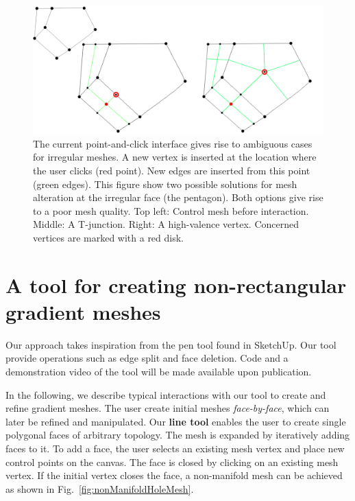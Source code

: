\documentclass{egpubl}
\begin{document}
	
	\begin{figure}[t]
		\centering
		\includegraphics[scale=0.2]{pentagonWControlMesh.png}
		\caption{The current point-and-click interface gives rise to ambiguous cases for irregular meshes. A new vertex is inserted at the location where the user clicks (red point). New edges are inserted from this point (green edges). This figure show two possible solutions for mesh alteration at the irregular face (the pentagon). Both options give rise to a poor mesh quality. Top left: Control mesh before interaction. Middle: A T-junction. Right: A high-valence vertex. Concerned vertices are marked with a red disk.
		}
		\label{fig:adHocPentagon}
	\end{figure}
	
	\section{A tool for creating non-rectangular gradient meshes}
	\label{sec:method}
	
	Our approach takes inspiration from the pen tool found in SketchUp. Our tool provide operations such as edge split and face deletion. Code and a demonstration video of the tool will be made available upon publication.
	
	In the following, we describe typical interactions with our tool to create and refine gradient meshes. The user create initial meshes \textit{face-by-face}, which can later be refined and manipulated. Our \textbf{line tool} enables the user to create single polygonal faces of arbitrary topology. The mesh is expanded by iteratively adding faces to it. To add a face, the user selects an existing mesh vertex and place new control points on the canvas. The face is closed by clicking on an existing mesh vertex. If the initial vertex closes the face, a non-manifold mesh can be achieved as shown in Fig.~\ref{fig:nonManifoldHoleMesh}.
	
\end{document}
